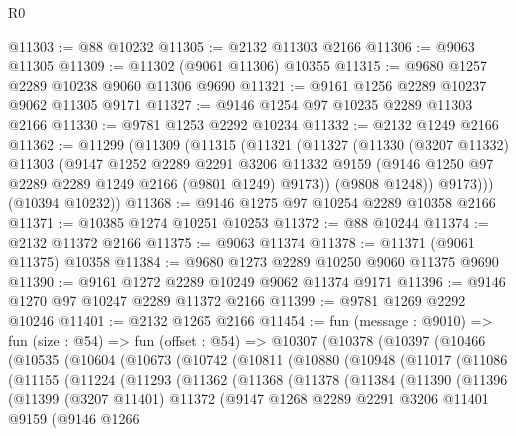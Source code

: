\begin{lexlean}{R0}
\begin{coremodule}
@11303 := @88 @10232
@11305 := @2132 @11303 @2166
@11306 := @9063 @11305
@11309 := @11302 (@9061 @11306) @10355
@11315 := @9680 @1257 @2289 @10238 @9060 @11306 @9690
@11321 := @9161 @1256 @2289 @10237 @9062 @11305 @9171
@11327 := @9146 @1254 @97 @10235 @2289 @11303 @2166
@11330 := @9781 @1253 @2292 @10234
@11332 := @2132 @1249 @2166
@11362 := @11299
    (@11309
      (@11315
        (@11321
          (@11327
            (@11330
              (@3207 @11332)
              @11303
              (@9147
                @1252
                @2289
                @2291
                @3206
                @11332
                @9159
                (@9146 @1250 @97 @2289 @2289 @1249 @2166 (@9801 @1249) @9173))
              (@9808 @1248))
            @9173)))
      (@10394 @10232))
@11368 := @9146 @1275 @97 @10254 @2289 @10358 @2166
@11371 := @10385 @1274 @10251 @10253
@11372 := @88 @10244
@11374 := @2132 @11372 @2166
@11375 := @9063 @11374
@11378 := @11371 (@9061 @11375) @10358
@11384 := @9680 @1273 @2289 @10250 @9060 @11375 @9690
@11390 := @9161 @1272 @2289 @10249 @9062 @11374 @9171
@11396 := @9146 @1270 @97 @10247 @2289 @11372 @2166
@11399 := @9781 @1269 @2292 @10246
@11401 := @2132 @1265 @2166
@11454 := fun (message : @9010) =>
  fun (size : @54) =>
  fun (offset : @54) =>
  @10307
    (@10378
      (@10397
        (@10466
          (@10535
            (@10604
              (@10673
                (@10742
                  (@10811
                    (@10880
                      (@10948
                        (@11017
                          (@11086
                            (@11155
                              (@11224
                                (@11293
                                  (@11362
                                    (@11368
                                      (@11378
                                        (@11384
                                          (@11390
                                            (@11396
                                              (@11399
                                                (@3207 @11401)
                                                @11372
                                                (@9147
                                                  @1268
                                                  @2289
                                                  @2291
                                                  @3206
                                                  @11401
                                                  @9159
                                                  (@9146
                                                    @1266

\end{coremodule}
\end{lexlean}
